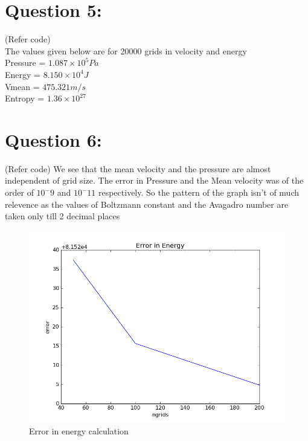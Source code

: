 \documentclass[11pt, a4paper]{article}
\begin{document}
\section{Question 5:}
(Refer code) \\
The values  given below are for 20000 grids in velocity and energy \\
Pressure = $1.087 \times 10^5 Pa$ \\
Energy = $8.150 \times 10^4 J$ \\
Vmean = $475.321 m/s$ \\
Entropy = $1.36 \times 10^27$\\


\section{Question 6:}
(Refer code)
We see that the mean velocity and the pressure are almost independent of grid size. The error in Pressure and the Mean 
velocity was of the order of $10^-9$ and $10^-11$ respectively. So the pattern of the graph isn't of much relevence
as the values of Boltzmann constant and the Avagadro number are taken only till 2 decimal places

\begin{figure}[H]
 \centering
 \includegraphics[scale = 0.5]{Error_e.png}
 \caption{Error in energy calculation}
 \label{fig:energy_error}
\end{figure}
\end{document}
